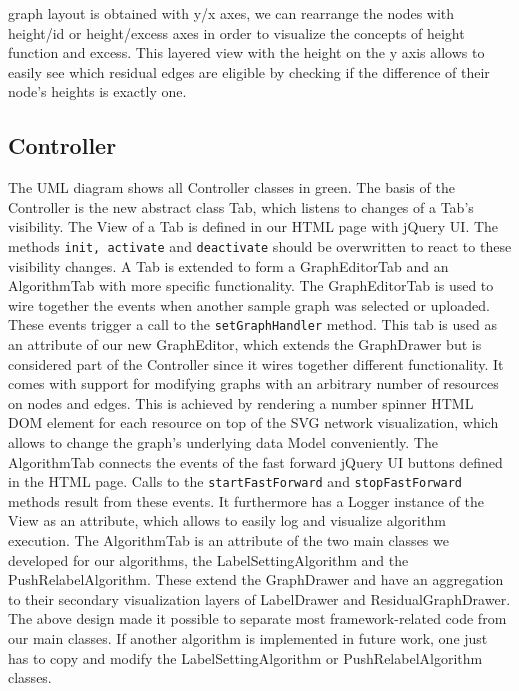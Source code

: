 graph layout is obtained with y/x axes, we can rearrange the nodes with height/id or height/excess axes in order to visualize the concepts of height function and excess. This layered view with the height on the y axis allows to easily see which residual edges are eligible by checking if the difference of their node's heights is exactly one.

\subsection{Controller}\label{sec:controller}
	
The UML diagram  shows all Controller classes in green.
The basis of the Controller is the new abstract class Tab, which listens to changes of a Tab's visibility. The View of a Tab is defined in our HTML page with jQuery UI. The methods \texttt{init, activate} and \texttt{deactivate} should be overwritten to react to these visibility changes. A Tab is extended to form a GraphEditorTab and an AlgorithmTab with more specific functionality. The GraphEditorTab is used to wire together the events when another sample graph was selected or uploaded. These events trigger a call to the \texttt{setGraphHandler} method. This tab is used as an attribute of our new GraphEditor, which extends the GraphDrawer but is considered part of the Controller since it wires together different functionality. It comes with support for modifying graphs with an arbitrary number of resources on nodes and edges. This is achieved by rendering a number spinner HTML DOM element for each resource on top of the SVG network visualization, which allows to change the graph's underlying data Model conveniently. The AlgorithmTab connects the events of the fast forward jQuery UI buttons defined in the HTML page. Calls to the \texttt{startFastForward} and \texttt{stopFastForward} methods result from these events. It furthermore has a Logger instance of the View as an attribute, which allows to easily log and visualize algorithm execution. The AlgorithmTab is an attribute of the two main classes we developed for our algorithms, the LabelSettingAlgorithm and the PushRelabelAlgorithm. These extend the GraphDrawer and have an aggregation to their secondary visualization layers of LabelDrawer and ResidualGraphDrawer. The above design made it possible to separate most framework-related code from our main classes. If another algorithm is implemented in future work, one just has to copy and modify the LabelSettingAlgorithm or PushRelabelAlgorithm classes.



